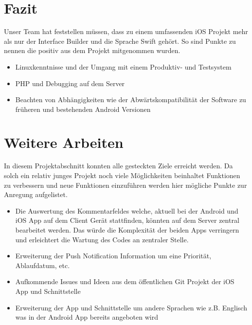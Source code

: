 \newpage

\section{Fazit}
Unser Team hat feststellen müssen, dass zu einem umfassenden iOS Projekt mehr als nur der Interface Builder und die Sprache Swift gehört. So sind Punkte zu nennen die positiv aus dem Projekt mitgenommen wurden.
\begin{itemize}
\item Linuxkenntnisse und der Umgang mit einem Produktiv- und Testsystem
\item PHP und Debugging auf dem Server
\item Beachten von Abhängigkeiten wie der Abwärtskompatibilität der Software zu früheren und bestehenden Android Versionen
\end{itemize}

\section{Weitere Arbeiten}
In diesem Projektabschnitt konnten alle gesteckten Ziele erreicht werden. Da solch ein relativ junges Projekt noch viele Möglichkeiten beinhaltet Funktionen zu verbessern und neue Funktionen einzuführen werden hier mögliche Punkte zur Anregung aufgelistet.

\begin{itemize}
\item Die Auswertung des Kommentarfeldes welche, aktuell bei der Android und iOS App auf dem Client Gerät stattfinden, könnten auf dem Server zentral bearbeitet werden. Das würde die Komplexität der beiden Apps verringern und erleichtert die Wartung des Codes an zentraler Stelle.
\item Erweiterung der Push Notification Information um eine Priorität, Ablaufdatum, etc.
\item Aufkommende Issues und Ideen aus dem öffentlichen Git Projekt der iOS App und Schnittstelle
\item Erweiterung der App und Schnittstelle um andere Sprachen wie z.B. Englisch was in der Android App bereits angeboten wird

\end{itemize}

